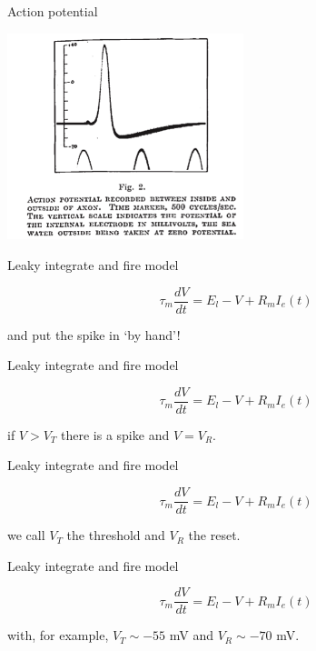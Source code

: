\documentclass{beamer}
\newcommand{\crish}{\color{reddish}}
\newcommand{\cbla}{\color{black}}
\newcommand{\cblu}{\color{blue}}
\begin{document}
\begin{frame}{Action potential}
  \begin{center}
    \includegraphics[height=6cm]{HH_spike.png}
\end{center}
    \vfill
  \end{frame}

\begin{frame}{Leaky integrate and fire model}

  \crish
  $$\tau_m\frac{dV}{dt}=E_l-V+R_mI_e(t)$$
  \cbla

and put the spike in `by hand'!
  
\end{frame}


\begin{frame}{Leaky integrate and fire model}

  \crish
  $$\tau_m\frac{dV}{dt}=E_l-V+R_mI_e(t)$$
  \cbla

  if \crish{}$V>V_T$\cbla{} there is a \cblu{}spike\cbla{} and \crish{}$V=V_R$\cbla{}.
  
\end{frame}


\begin{frame}{Leaky integrate and fire model}

  \crish
  $$\tau_m\frac{dV}{dt}=E_l-V+R_mI_e(t)$$
  \cbla

  we call \crish{}$V_T $\cbla{} the \cblu{}threshold\cbla{} and
  \crish{}$V_R$\cbla{} the \cblu{} reset\cbla{}.
  
\end{frame}


\begin{frame}{Leaky integrate and fire model}

  \crish
  $$\tau_m\frac{dV}{dt}=E_l-V+R_mI_e(t)$$
  \cbla

  with, for example, \crish{}$V_T\sim-55 $ mV\cbla{} and \crish{}$V_R\sim-70$ mV\cbla.
  
\end{frame}
\end{document}
